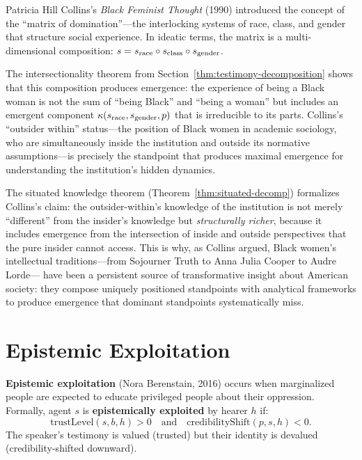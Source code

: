 \begin{remark}
Patricia Hill Collins's \emph{Black Feminist Thought} (1990) introduced the concept
of the ``matrix of domination''---the interlocking systems of race, class, and gender
that structure social experience. In ideatic terms, the matrix is a multi-dimensional
composition: $s = s_{\text{race}} \circ s_{\text{class}} \circ s_{\text{gender}}$.

The intersectionality theorem from Section~\ref{thm:testimony-decomposition} shows
that this composition produces emergence: the experience of being a Black woman is
not the sum of ``being Black'' and ``being a woman'' but includes an emergent
component $\kappa(s_{\text{race}}, s_{\text{gender}}, p)$ that is irreducible to
its parts. Collins's ``outsider within'' status---the position of Black women in
academic sociology, who are simultaneously inside the institution and outside its
normative assumptions---is precisely the standpoint that produces maximal emergence
for understanding the institution's hidden dynamics.

The situated knowledge theorem (Theorem~\ref{thm:situated-decomp}) formalizes
Collins's claim: the outsider-within's knowledge of the institution is not merely
``different'' from the insider's knowledge but \emph{structurally richer}, because
it includes emergence from the intersection of inside and outside perspectives that
the pure insider cannot access. This is why, as Collins argued, Black women's
intellectual traditions---from Sojourner Truth to Anna Julia Cooper to Audre Lorde---
have been a persistent source of transformative insight about American society:
they compose uniquely positioned standpoints with analytical frameworks to produce
emergence that dominant standpoints systematically miss.
\end{remark}

\section{Epistemic Exploitation}

\begin{definition}
\label{def:epistemic-exploitation}
\textbf{Epistemic exploitation} (Nora Berenstain, 2016) occurs when marginalized
people are expected to educate privileged people about their oppression. Formally,
agent $s$ is \textbf{epistemically exploited} by hearer $h$ if:
\[
  \mathrm{trustLevel}(s, b, h) > 0 \quad\text{and}\quad \mathrm{credibilityShift}(p, s, h) < 0.
\]
The speaker's testimony is valued (trusted) but their identity is devalued
(credibility-shifted downward).
\end{definition}


